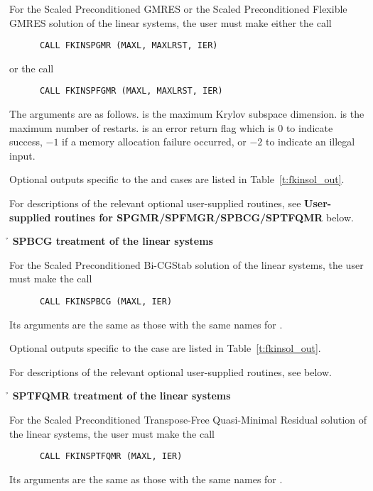 \begin{Steps}
  For the Scaled Preconditioned GMRES 
  or the Scaled Preconditioned Flexible GMRES solution of the linear systems,
  the user must make either the call
\begin{verbatim}
      CALL FKINSPGMR (MAXL, MAXLRST, IER)
\end{verbatim}
or the call
\begin{verbatim}
      CALL FKINSPFGMR (MAXL, MAXLRST, IER)
\end{verbatim}
  The arguments are as follows.
   is the maximum Krylov subspace dimension.
   is the maximum number of restarts.
   is an error return flag which is $0$ to indicate success, $-1$
  if a memory allocation failure occurred, or $-2$ to indicate an illegal input.
  
  Optional outputs specific to the {\spgmr} and {\spfgmr} cases are listed in
  Table~\ref{t:fkinsol_out}.

  For descriptions of the relevant optional user-supplied routines, see 
  {\bf User-supplied routines for SPGMR/SPFMGR/SPBCG/SPTFQMR} below.
  
  
  {\s}{\p}{\h} {\bf SPBCG treatment of the linear systems}
  
  For the Scaled Preconditioned Bi-CGStab solution of the linear systems,
  the user must make the call
\begin{verbatim}
      CALL FKINSPBCG (MAXL, IER)
\end{verbatim}
  Its arguments are the same as those with the same names for .

  Optional outputs specific to the {\spbcg} case are listed in
  Table~\ref{t:fkinsol_out}.

  For descriptions of the relevant optional user-supplied routines, see below.
  
  
  {\s}{\p}{\h} {\bf SPTFQMR treatment of the linear systems}
  
  For the Scaled Preconditioned Transpose-Free Quasi-Minimal Residual solution 
  of the linear systems, the user must make the call
\begin{verbatim}
      CALL FKINSPTFQMR (MAXL, IER)
\end{verbatim}
  Its arguments are the same as those with the same names for .


\end{Steps}
